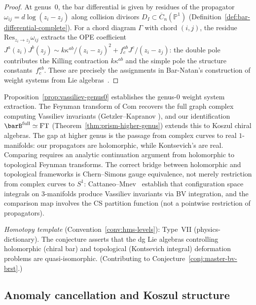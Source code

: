 \begin{proof}
At genus~$0$, the bar differential is given by residues of
the propagator $\omega_{ij} = d\log(z_i - z_j)$ along collision
divisors $D_I \subset \overline{C}_n(\mathbb{P}^1)$
(Definition~\ref{def:bar-differential-complete}).  For a chord
diagram $\Gamma$ with chord $(i,j)$, the residue
$\mathrm{Res}_{z_i \to z_j} \omega_{ij}$ extracts the
OPE coefficient $J^a(z_i) J^b(z_j) \sim k \kappa^{ab}/(z_i-z_j)^2
+ f^{ab}_c J^c/(z_i-z_j)$: the double pole contributes the
Killing contraction $k\kappa^{ab}$ and the simple pole the
structure constants~$f^{ab}_c$.  These are precisely the
assignments in Bar-Natan's construction of weight systems from
Lie algebras~\cite{BarNatan95}.
\end{proof}

\begin{remark}[Scope]\label{rem:vassiliev-scope}
Proposition~\ref{prop:vassiliev-genus0} establishes the genus-$0$
weight system extraction.  The Feynman transform of $\mathrm{Com}$
recovers the full graph complex computing Vassiliev invariants
(Getzler--Kapranov \cite{GeK98}), and our identification
$\barB^{\mathrm{full}} \simeq \mathrm{FT}$
(Theorem~\ref{thm:prism-higher-genus}) extends this to Koszul
chiral algebras.  The gap at higher genus is the passage from
complex curves to real $1$-manifolds: our propagators are
holomorphic, while Kontsevich's are real.  Comparing requires an
analytic continuation argument from holomorphic to topological
Feynman transforms.
The correct bridge between holomorphic and topological frameworks is Chern--Simons gauge equivalence, not merely restriction from complex curves to $S^1$: Cattaneo--Mnev~\cite{CattaneoMnev10} establish that configuration space integrals on $3$-manifolds produce Vassiliev invariants via BV integration, and the comparison map involves the CS partition function (not a pointwise restriction of propagators).

\emph{Homotopy template} (Convention~\ref{conv:hms-levels}): Type~VII (physics-dictionary).
The conjecture asserts that the dg Lie algebras controlling
holomorphic (chiral bar) and topological (Kontsevich integral)
deformation problems are quasi-isomorphic.
(Contributing to Conjecture~\ref{conj:master-bv-brst}.)
\end{remark}

\subsection{Anomaly cancellation and Koszul structure}
\label{subsec:anomaly-koszul}

